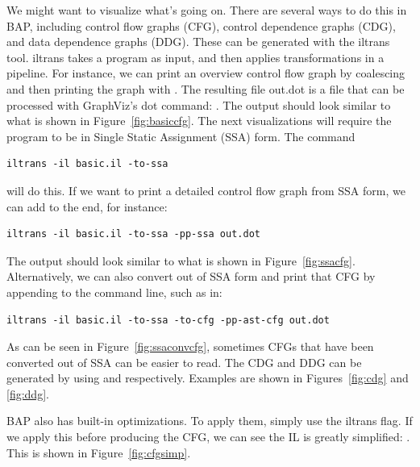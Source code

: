 We might want to visualize what's going on.  There are several ways to
do this in BAP, including control flow graphs (CFG), control
dependence graphs (CDG), and data dependence graphs (DDG).  These can
be generated with the iltrans tool.  iltrans takes a program as input,
and then applies transformations in a pipeline.  For instance, we can
print an overview control flow graph by coalescing and then printing
the graph with . The resulting file out.dot is a
file that can be processed with GraphViz's dot command: .  The output should look similar to what
is shown in Figure~\ref{fig:basiccfg}. The next visualizations will
require the program to be in Single Static Assignment (SSA) form.  The
command
\begin{verbatim}
iltrans -il basic.il -to-ssa
\end{verbatim}
will do this.  If we want to print a detailed control flow graph from
SSA form, we can add  to the end, for
instance: 
\begin{verbatim}
iltrans -il basic.il -to-ssa -pp-ssa out.dot
\end{verbatim}
The output should look similar to what is shown in
Figure~\ref{fig:ssacfg}. Alternatively, we can also convert out of SSA
form and print that CFG by appending  to the command line, such as in:
\begin{verbatim}
iltrans -il basic.il -to-ssa -to-cfg -pp-ast-cfg out.dot
\end{verbatim}
As can be seen in Figure~\ref{fig:ssaconvcfg}, sometimes CFGs that
have been converted out of SSA can be easier to read. The CDG and DDG
can be generated by using  and
 respectively. Examples are shown in
Figures~\ref{fig:cdg} and \ref{fig:ddg}.

BAP also has built-in optimizations.  To apply them, simply use the
 iltrans flag.  If we apply this before producing
the CFG, we can see the IL is greatly simplified: . This is shown in
Figure~\ref{fig:cfgsimp}.

